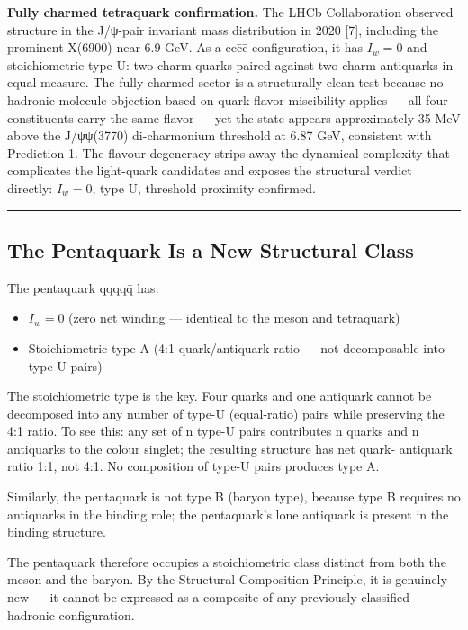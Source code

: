 \textbf{Fully charmed tetraquark confirmation.} The LHCb Collaboration
observed structure in the J/ψ-pair invariant mass distribution in 2020
{[}7{]}, including the prominent X(6900) near 6.9 GeV. As a ccc̄c̄
configuration, it has \(I_w = 0\) and stoichiometric type U: two charm
quarks paired against two charm antiquarks in equal measure. The fully
charmed sector is a structurally clean test because no hadronic molecule
objection based on quark-flavor miscibility applies --- all four
constituents carry the same flavor --- yet the state appears
approximately 35 MeV above the J/ψψ(3770) di-charmonium threshold at
6.87 GeV, consistent with Prediction 1. The flavour degeneracy strips
away the dynamical complexity that complicates the light-quark
candidates and exposes the structural verdict directly: \(I_w = 0\),
type U, threshold proximity confirmed.

\begin{center}\rule{0.5\linewidth}{0.5pt}\end{center}

\hypertarget{the-pentaquark-is-a-new-structural-class}{%
\subsection{The Pentaquark Is a New Structural
Class}\label{the-pentaquark-is-a-new-structural-class}}

The pentaquark qqqqq̄ has:

\begin{itemize}
\tightlist
\item
  \(I_w = 0\) (zero net winding --- identical to the meson and
  tetraquark)
\item
  Stoichiometric type A (4:1 quark/antiquark ratio --- not decomposable
  into type-U pairs)
\end{itemize}

The stoichiometric type is the key. Four quarks and one antiquark cannot
be decomposed into any number of type-U (equal-ratio) pairs while
preserving the 4:1 ratio. To see this: any set of n type-U pairs
contributes n quarks and n antiquarks to the colour singlet; the
resulting structure has net quark- antiquark ratio 1:1, not 4:1. No
composition of type-U pairs produces type A.

Similarly, the pentaquark is not type B (baryon type), because type B
requires no antiquarks in the binding role; the pentaquark's lone
antiquark is present in the binding structure.

The pentaquark therefore occupies a stoichiometric class distinct from
both the meson and the baryon. By the Structural Composition Principle,
it is genuinely new --- it cannot be expressed as a composite of any
previously classified hadronic configuration.

